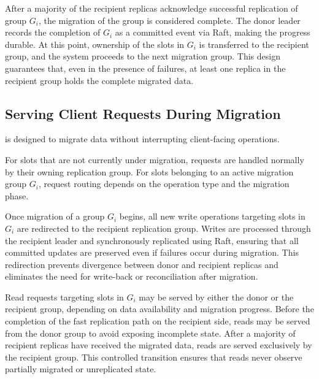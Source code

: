 After a majority of the recipient replicas acknowledge successful replication of group $G_i$, the migration of the group is considered complete.
The donor leader records the completion of $G_i$ as a committed event via Raft, making the progress durable.
At this point, ownership of the slots in $G_i$ is transferred to the recipient group, and the system proceeds to the next migration group.
This design guarantees that, even in the presence of failures, at least one replica in the recipient group holds the complete migrated data.


\subsection{Serving Client Requests During Migration}
\label{sec:serving-during-migration}

\OurImplementation{} is designed to migrate data without interrupting client-facing operations.

For slots that are not currently under migration, requests are handled normally by their owning replication group.
For slots belonging to an active migration group $G_i$, request routing depends on the operation type and the migration phase.

Once migration of a group $G_i$ begins, all new write operations targeting slots in $G_i$ are redirected to the recipient replication group.
Writes are processed through the recipient leader and synchronously replicated using Raft, ensuring that all committed updates are preserved even if failures occur during migration.
This redirection prevents divergence between donor and recipient replicas and eliminates the need for write-back or reconciliation after migration.

Read requests targeting slots in $G_i$ may be served by either the donor or the recipient group, depending on data availability and migration progress.
Before the completion of the fast replication path on the recipient side, reads may be served from the donor group to avoid exposing incomplete state.
After a majority of recipient replicas have received the migrated data, reads are served exclusively by the recipient group.
This controlled transition ensures that reads never observe partially migrated or unreplicated state.


